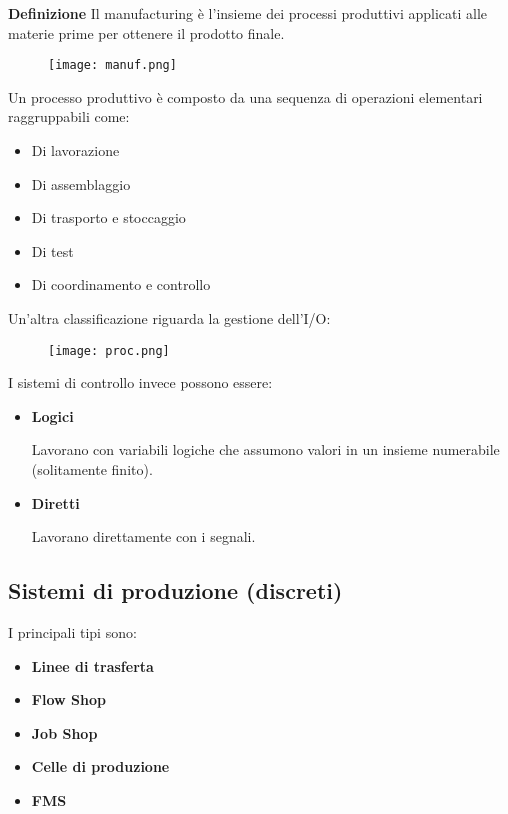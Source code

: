 \documentclass{article}
\newcommand{\df}[1]{\noindent\textbf{Definizione } #1.\newline}
\begin{document}
\df{Il manufacturing è l'insieme dei processi produttivi applicati alle materie prime per ottenere il prodotto finale}

\begin{figure}[ht]
    \centering
    \texttt{[image: manuf.png]}
\end{figure}

\vspace{5pt}

\noindent Un processo produttivo è composto da una sequenza di operazioni elementari raggruppabili come:
\begin{itemize}
    \item Di lavorazione
    \item Di assemblaggio
    \item Di trasporto e stoccaggio
    \item Di test
    \item Di coordinamento e controllo
\end{itemize}

\newpage

\noindent Un'altra classificazione riguarda la gestione dell'I/O:

\begin{figure}[ht]
    \centering
    \texttt{[image: proc.png]}
\end{figure}

\noindent I sistemi di controllo invece possono essere:
\begin{itemize}
    \item \textbf{Logici}

        Lavorano con variabili logiche che assumono valori in un insieme numerabile (solitamente finito).
    
    \item \textbf{Diretti}

        Lavorano direttamente con i segnali.\newline
    
\end{itemize}

\subsection{Sistemi di produzione (discreti)}

I principali tipi sono:
\begin{itemize}
    \item \textbf{Linee di trasferta}
    \item \textbf{Flow Shop}
    \item \textbf{Job Shop}
    \item \textbf{Celle di produzione}
    \item \textbf{FMS}
\end{itemize}
\end{document}
